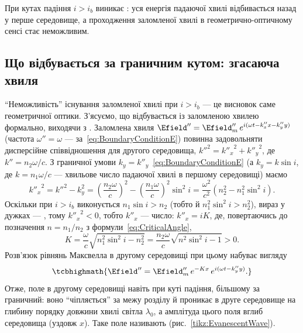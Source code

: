 При кутах падіння $i>i_b$ виникає : уся енергія падаючої хвилі відбивається назад у перше середовище, а
проходження заломленої хвилі в геометрично-оптичному сенсі стає неможливим.


\subsection*{Що відбувається за граничним кутом: згасаюча хвиля}

\enquote{Неможливість} існування заломленої хвилі при $i>i_b$ --- це висновок саме геометричної оптики. З'ясуємо, що відбувається із заломленою
хвилею формально, виходячи з . Заломлена хвиля $\Efield'' = \Efield''_m\, e^{i(\omega t-k''_xx-k''_yy)}$ (частота
$\omega''=\omega$ --- за~\eqref{eq:BoundaryConditionE}) повинна задовольняти дисперсійне співвідношення для другого середовища,
$k''^2={k''_x}^2+{k''_y}^2$, де $k''=n_2\omega/c$. З граничної умови $k_y=k''_y$~\eqref{eq:BoundaryConditionE} (а $k_y=k\sin i$, де
$k=n_1\omega/c$ --- хвильове число падаючої хвилі в першому середовищі) маємо
\begin{equation*}
	{k''_x}^2 = k''^2-k_y^2 = \left(\frac{n_2\omega}c\right)^{\!2}-\left(\frac{n_1\omega}c\right)^{\!2}\sin^2i = \frac{\omega^2}{c^2}\left(n_2^2-n_1^2\sin^2i\right).
\end{equation*}
Оскільки при $i>i_b$ виконується $n_1\sin i>n_2$ (тобто й $n_1^2\sin^2i>n_2^2$), вираз у дужках --- , тому ${k''_x}^2<0$, тобто
$k''_x$ ---  число: $k''_x = iK$, де, повертаючись до позначення $n=n_1/n_2$ з формули~\eqref{eq:CriticalAngle},
\begin{equation*}
	K = \frac\omega c\sqrt{n_1^2\sin^2i-n_2^2} = \frac{n_2\omega}c\sqrt{n^2\sin^2i-1} > 0.
\end{equation*}
Розв'язок рівнянь Максвелла в другому середовищі при цьому набуває вигляду
\begin{equation}\label{eq:EvanescentWave}
	\tcbhighmath{
		\Efield'' = \Efield''_m\, e^{-Kx}\, e^{i(\omega t-k''_yy)}.
	}
\end{equation}
Отже, поле в другому середовищі  навіть при куті падіння, більшому за граничний: воно \enquote{чіпляється} за межу розділу
й проникає в друге середовище на глибину порядку довжини хвилі світла $\lambda_0$, а амплітуда цього поля 
вглиб середовища (уздовж $x$). Таке поле називають  (рис.~\ref{tikz:EvanescentWave}).

